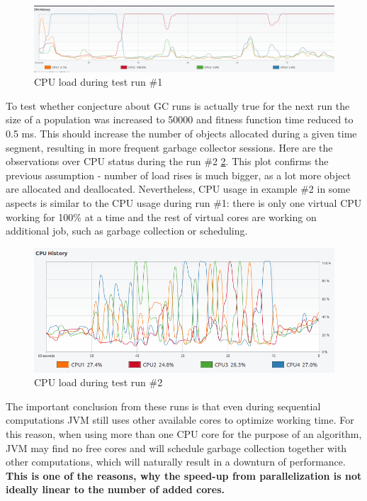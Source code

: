 \begin{figure}[h]
\centering\includegraphics[width=1\textwidth]{img/exp/1/cpu-500}
\caption{CPU load during test run \#1}  \label{img:cpu-run-1}
\end{figure}

To test whether conjecture about GC runs is actually true for the next run the size of a population was increased to 50000 and fitness function time reduced to 0.5 ms. This should increase the number of objects allocated during a given time segment, resulting in more frequent garbage collector sessions. Here are the observations over CPU status during the run \#2 \ref{img:cpu-run-2}. This plot confirms the previous assumption - number of load rises is much bigger, as a lot more object are allocated and deallocated. Nevertheless, CPU usage in example \#2 in some aspects is similar to the CPU usage during run \#1: there is only one virtual CPU working for 100\% at a time and the rest of virtual cores are working on additional job, such as garbage collection or scheduling.

\begin{figure}[h]
\centering\includegraphics[width=1\textwidth]{img/exp/1/cpu-5000}
\caption{CPU load during test run \#2}  \label{img:cpu-run-2}
\end{figure}

The important conclusion from these runs is that even during sequential computations JVM still uses other available cores to optimize working time. For this reason, when using more than one CPU core for the purpose of an algorithm, JVM may find no free cores and will schedule garbage collection together with other computations, which will naturally result in a downturn of performance. \textbf{This is one of the reasons, why the speed-up from parallelization is not ideally linear to the number of added cores.}


